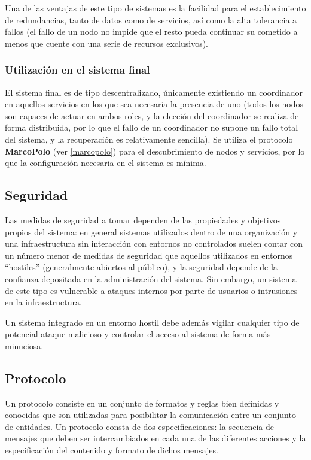 Una de las ventajas de este tipo de sistemas es la facilidad para el establecimiento de redundancias, tanto de datos como de servicios, así como la alta tolerancia a fallos (el fallo de un nodo no impide que el resto pueda continuar su cometido a menos que cuente con una serie de recursos exclusivos).


\subsubsection{Utilización en el sistema final}

El sistema final es de tipo descentralizado, únicamente existiendo un coordinador en aquellos servicios en los que sea necesaria la presencia de uno (todos los nodos son capaces de actuar en ambos roles, y la elección del coordinador se realiza de forma distribuida, por lo que el fallo de un coordinador no supone un fallo total del sistema, y la recuperación es relativamente sencilla). Se utiliza el protocolo \textbf{MarcoPolo} (ver \ref{marcopolo}) para el descubrimiento de nodos y servicios, por lo que la configuración necesaria en el sistema es mínima.

\subsection{Seguridad}

Las medidas de seguridad a tomar dependen de las propiedades y objetivos propios del sistema: en general sistemas utilizados dentro de una organización y una infraestructura sin interacción con entornos no controlados suelen contar con un número menor de medidas de seguridad que aquellos utilizados en entornos ``hostiles'' (generalmente abiertos al público), y la seguridad depende de la confianza depositada en la administración del sistema. Sin embargo, un sistema de este tipo es vulnerable a ataques internos por parte de usuarios o intrusiones en la infraestructura.

Un sistema integrado en un entorno hostil debe además vigilar cualquier tipo de potencial ataque malicioso y controlar el acceso al sistema de forma más minuciosa.

\subsection{Protocolo}

Un protocolo consiste en un conjunto de formatos y reglas bien definidas y conocidas que son utilizadas para posibilitar la comunicación entre un conjunto de entidades. Un protocolo consta de dos especificaciones: la secuencia de mensajes que deben ser intercambiados en cada una de las diferentes acciones y la especificación del contenido y formato de dichos mensajes.

